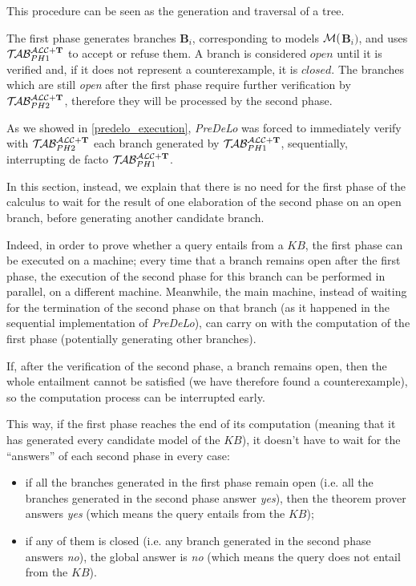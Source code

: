 \documentclass[a4paper, 11pt, oneside]{duthesis}
\newcommand{\tip}{{\bf T}}
\newcommand{\emme} {\begin{mathcal}M\end{mathcal}}
\newcommand{\primo}{\mathrel{{\mathcal{T}\!\mathcal{AB}}}_{PH 1}^{\mathcal{ALC}+\mbox{\scriptsize $\tip$}}}
\newcommand{\secondo}{\mathrel{{\mathcal{T}\!\mathcal{AB}}}_{PH 2}^{\mathcal{ALC}+\mbox{\scriptsize $\tip$}}}
\begin{document}
This procedure can be seen as the generation and traversal of a tree.

The first phase generates branches \textbf{B}$_i$, corresponding to models $\emme($\textbf{B}$_i)$, and uses $\primo$ to accept or refuse them.
A branch is considered $open$ until it is verified and, if it does not represent a counterexample, it is $closed$. The branches which are still \emph{open} after the first phase require further verification by $\secondo$, therefore they will be processed by the second phase.

As we showed in \ref{predelo_execution}, \emph{PreDeLo} was forced to immediately verify with $\secondo$ each branch generated by $\primo$, sequentially, interrupting de facto $\primo$.

In this section, instead, we explain that there is no need for the first phase of the calculus to wait for the result of one elaboration of the second phase on an open branch, before generating another candidate branch.

Indeed, in order to prove whether a query entails from a $KB$, the first phase can be executed on a machine; every time that a branch remains open after the first phase, the execution of the second phase for this branch can be performed in parallel, on a different machine.
Meanwhile, the main machine, instead of waiting for the termination of the second phase on that branch (as it happened in the sequential implementation of \emph{PreDeLo}), can carry on with the computation of the first phase (potentially generating other branches).

If, after the verification of the second phase, a branch remains open, then the whole entailment cannot be satisfied (we have therefore found a counterexample), so the computation process can be interrupted early.

This way, if the first phase reaches the end of its computation (meaning that it has generated every candidate model of the $KB$), it doesn't have to wait for the ``answers'' of each second phase in every case:
\begin{itemize}
\item if all the branches generated in the first phase remain open (i.e. all the branches generated in the second phase answer \emph{yes}), then the theorem prover answers \emph{yes} (which means the query entails from the $KB$);
\item if any of them is closed (i.e. any branch generated in the second phase answers \emph{no}), the global answer is \emph{no} (which means the query does not entail from the $KB$).
\end{itemize}
\end{document}
